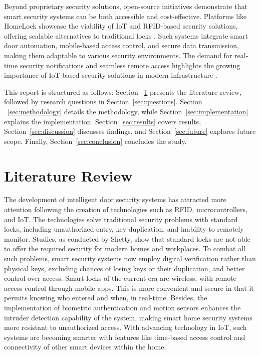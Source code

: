 \documentclass[a4paper]{scrartcl}
\begin{document}
Beyond proprietary security solutions, open-source initiatives demonstrate that smart security systems can be both accessible and cost-effective. Platforms like HomeLock showcase the viability of IoT and RFID-based security solutions, offering scalable alternatives to traditional locks \cite{GitHubHomeLock}. Such systems integrate smart door automation, mobile-based access control, and secure data transmission, making them adaptable to various security environments. The demand for real-time security notifications and seamless remote access highlights the growing importance of IoT-based security solutions in modern infrastructure \cite{Softengi2024}.

This report is structured as follows: Section ~\ref{sec:review} presents the literature review, followed by research questions in Section~\ref{sec:questions}. Section ~\ref{sec:methodology} details the methodology, while Section~\ref{sec:implementation} explains the implementation. Section~\ref{sec:results} covers results, Section~\ref{sec:discussion} discusses findings, and Section~\ref{sec:future} explores future scope. Finally, Section~\ref{sec:conclusion} concludes the study.


\section{Literature Review}
\label{sec:review} 
The development of intelligent door security systems has attracted more attention following the creation of technologies such as RFID, microcontrollers, and IoT. The technologies solve traditional security problems with standard locks, including unauthorized entry, key duplication, and inability to remotely monitor. Studies, as conducted by Shetty\cite{Shetty2020}, show that standard locks are not able to offer the required security for modern homes and workplaces. To combat all such problems, smart security systems now employ digital verification rather than physical keys, excluding chances of losing keys or their duplication, and better control over access. Smart locks of the current era are wireless, with remote access control through mobile apps. This is more convenient and secure in that it permits knowing who entered and when, in real-time. Besides, the implementation of biometric authentication and motion sensors enhances the intruder detection capability of the system, making smart home security systems more resistant to unauthorized access. With advancing technology in IoT, such systems are becoming smarter with features like time-based access control and connectivity of other smart devices within the home.
\end{document}
